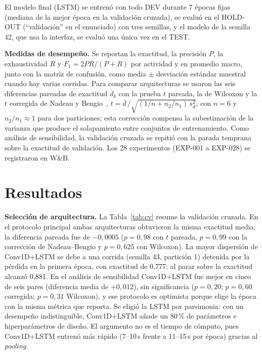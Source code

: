 \documentclass[runningheads]{llncs}
\begin{document}
El modelo final (LSTM) se entrenó con todo DEV durante 7 épocas fijas (mediana
de la mejor época en la validación cruzada), se evaluó en el HOLD-OUT
(``validación'' en el enunciado) con tres semillas, y el modelo de la semilla 42,
que usa la interfaz, se evaluó una única vez en el TEST.

\textbf{Medidas de desempeño.} Se reportan la exactitud, la precisión $P$, la
exhaustividad $R$ y $F_1=2PR/(P+R)$ por actividad y en promedio macro, junto con
la matriz de confusión, como media $\pm$ desviación estándar muestral cuando hay
varias corridas. Para comparar arquitecturas se usaron las seis diferencias
pareadas de exactitud $d_k$ con la prueba $t$ pareada, la de Wilcoxon y la $t$
corregida de Nadeau y Bengio~\cite{nadeau2003},
$t=\bar d\,/\sqrt{(1/n+n_2/n_1)\,s_d^2}$, con $n=6$ y $n_2/n_1\approx1$ para dos
particiones; esta corrección compensa la subestimación de la varianza que produce
el solapamiento entre conjuntos de entrenamiento. Como análisis de sensibilidad,
la validación cruzada se repitió con la parada temprana sobre la exactitud de
validación. Los 28 experimentos (EXP-001 a EXP-028) se registraron en W\&B.

\section{Resultados}

\textbf{Selección de arquitectura.} La Tabla~\ref{tab:cv} resume la validación
cruzada. %
En el protocolo principal ambas arquitecturas obtuvieron la misma exactitud
media; la diferencia pareada fue de $-0{,}0005$ ($p=0{,}98$ con $t$ pareada,
$p=0{,}99$ con la corrección de Nadeau--Bengio y $p=0{,}625$ con Wilcoxon). La mayor dispersión de Conv1D+LSTM se debe a una corrida (semilla 43, partición
1) detenida por la pérdida en la primera época, con exactitud de 0,777; al parar
sobre la exactitud alcanzó 0,881. En el análisis de sensibilidad
Conv1D+LSTM fue mejor en cinco de seis pares (diferencia media de $+0{,}012$),
sin significancia ($p=0{,}20$; $p=0{,}60$ corregida; $p=0{,}31$ Wilcoxon), y
ese protocolo es optimista porque elige la época con la misma métrica que
reporta. Se eligió la LSTM por parsimonia: con un desempeño indistinguible,
Conv1D+LSTM añade un 80\,\% de parámetros e hiperparámetros de diseño. El
argumento no es el tiempo de cómputo, pues Conv1D+LSTM entrenó más rápido
(7--10\,s frente a 11--15\,s por época) gracias al \emph{pooling}.
\end{document}
